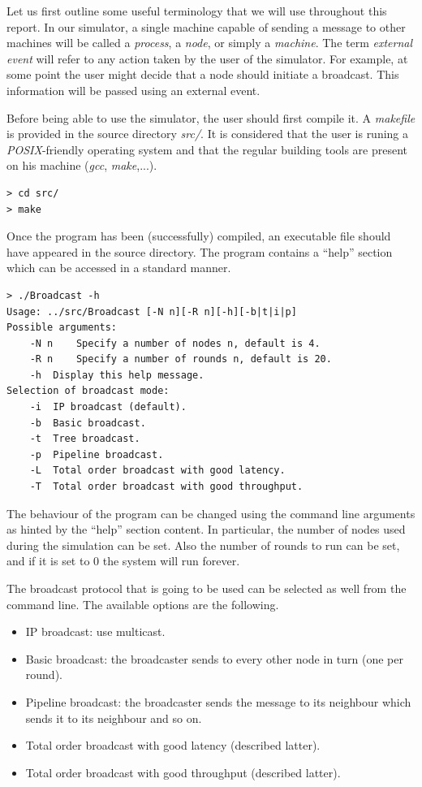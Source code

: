 \documentclass[a4paper]{article}
\begin{document}
Let us first outline some useful terminology that we will use throughout this
report. In our simulator, a single machine capable of sending a message to
other machines will be called a \textit{process}, a \textit{node}, or simply
a \textit{machine}. The term \textit{external event} will refer to any action
taken by the user of the simulator. For example, at some point the user might
decide that a node should initiate a broadcast. This information will be
passed using an external event.

Before being able to use the simulator, the user should first compile it. A
\textit{makefile} is provided in the source directory \textit{src/}. It is
considered that the user is runing a \textit{POSIX}-friendly operating system
and that the regular building tools are present on his machine (\textit{gcc},
\textit{make},...).
\begin{lstlisting}
> cd src/
> make
\end{lstlisting}

Once the program has been (successfully) compiled, an executable file should
have appeared in the source directory. The program contains a ``help'' section
which can be accessed in a standard manner.
\begin{lstlisting}
> ./Broadcast -h
Usage: ../src/Broadcast [-N n][-R n][-h][-b|t|i|p]
Possible arguments:
	-N n	Specify a number of nodes n, default is 4.
	-R n	Specify a number of rounds n, default is 20.
	-h	Display this help message.
Selection of broadcast mode:
	-i	IP broadcast (default).
	-b	Basic broadcast.
	-t	Tree broadcast.
	-p	Pipeline broadcast.
	-L	Total order broadcast with good latency.
	-T	Total order broadcast with good throughput.
\end{lstlisting}

The behaviour of the program can be changed using the command line arguments
as hinted by the ``help'' section content. In particular, the number of nodes
used during the simulation can be set. Also the number of rounds to run can be
set, and if it is set to $0$ the system will run forever.

The broadcast protocol that is going to be used can be selected as well from
the command line. The available options are the following.
\begin{itemize}
  \item IP broadcast: use multicast.
  \item Basic broadcast: the broadcaster sends to every other node in turn
        (one per round).
  \item Pipeline broadcast: the broadcaster sends the message to its neighbour
        which sends it to its neighbour and so on.
  \item Total order broadcast with good latency (described latter).
  \item Total order broadcast with good throughput (described latter).
\end{itemize}
\end{document}
